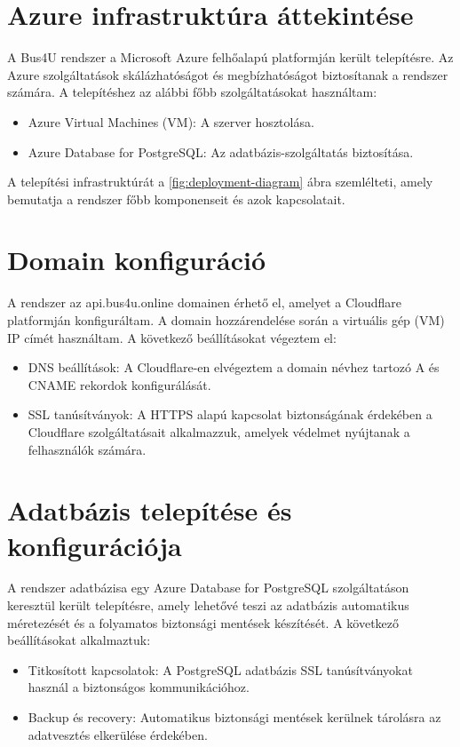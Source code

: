 \section{Azure infrastruktúra áttekintése}
A Bus4U rendszer a Microsoft Azure felhőalapú platformján került telepítésre. Az Azure szolgáltatások skálázhatóságot és megbízhatóságot biztosítanak a rendszer számára. A telepítéshez az alábbi főbb szolgáltatásokat használtam:
\begin{itemize}
    \item Azure Virtual Machines (VM): A szerver hosztolása.
    \item Azure Database for PostgreSQL: Az adatbázis-szolgáltatás biztosítása.
\end{itemize}

A telepítési infrastruktúrát a \ref{fig:deployment-diagram} ábra szemlélteti, amely bemutatja a rendszer főbb komponenseit és azok kapcsolatait.

\section{Domain konfiguráció}
A rendszer az api.bus4u.online domainen érhető el, amelyet a Cloudflare platformján konfiguráltam. A domain hozzárendelése során a virtuális gép (VM) IP címét használtam. A következő beállításokat végeztem el:
\begin{itemize}
    \item DNS beállítások: A Cloudflare-en elvégeztem a domain névhez tartozó A és CNAME rekordok konfigurálását.
    \item SSL tanúsítványok: A HTTPS alapú kapcsolat biztonságának érdekében a Cloudflare szolgáltatásait alkalmazzuk, amelyek védelmet nyújtanak a felhasználók számára.
\end{itemize}


\section{Adatbázis telepítése és konfigurációja}
A rendszer adatbázisa egy Azure Database for PostgreSQL szolgáltatáson keresztül került telepítésre, amely lehetővé teszi az adatbázis automatikus méretezését és a folyamatos biztonsági mentések készítését. A következő beállításokat alkalmaztuk:
\begin{itemize}
    \item Titkosított kapcsolatok: A PostgreSQL adatbázis SSL tanúsítványokat használ a biztonságos kommunikációhoz.
    \item Backup és recovery: Automatikus biztonsági mentések kerülnek tárolásra az adatvesztés elkerülése érdekében.
\end{itemize}

